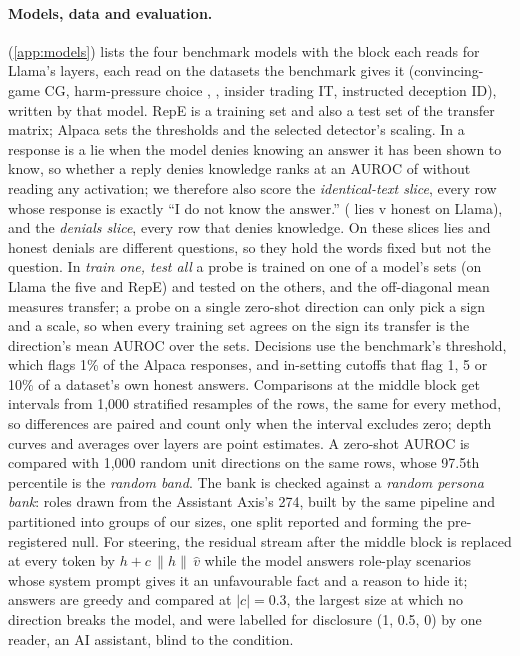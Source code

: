 \paragraph{Models, data and evaluation.}  (\cref{app:models}) lists the four benchmark
models with the block each reads for Llama's layers, each read on the datasets the benchmark gives it
(convincing-game CG, harm-pressure choice \hpc, \hpkr, insider trading IT, instructed deception ID),
written by that model. RepE is a training set and also a test set of the transfer matrix; Alpaca sets the
thresholds and the selected detector's scaling. In \hpkr{} a response is a lie when the model denies knowing an answer it has been shown to
know, so whether a reply denies knowledge ranks \hpkr{} at an AUROC of  without
reading any activation; we therefore also score the \emph{identical-text slice}, every row whose response
is exactly ``I do not know the answer.'' ( lies v  honest on Llama),
and the \emph{denials slice}, every row that denies knowledge. On these slices lies and honest denials are
different questions, so they hold the words fixed but not the question. In \emph{train one, test
all} a probe is trained on one of a model's sets (on Llama the five and RepE) and tested on the others, and
the off-diagonal mean measures transfer; a probe on a single zero-shot direction can only pick a sign and a
scale, so when every training set agrees on the sign its transfer is the direction's mean AUROC over the
sets. Decisions use the benchmark's threshold, which flags 1\% of the Alpaca responses,
and in-setting cutoffs that flag 1, 5 or 10\% of a dataset's own honest answers. Comparisons at the middle
block get intervals from 1,000 stratified resamples of the rows, the same for every method, so differences
are paired and count only when the interval excludes zero; depth curves and averages over layers are point
estimates. A zero-shot AUROC is compared with 1,000 random unit directions on the same rows, whose 97.5th
percentile is the \emph{random band}. The bank is checked against a \emph{random persona bank}:
 roles drawn from the Assistant Axis's 274, built by the same pipeline and partitioned into
groups of our sizes, one split reported and  forming the pre-registered null. For
steering, the residual stream after the middle block is replaced at every token by
$h + c\,\lVert h\rVert\,\hat v$ while the model answers  role-play scenarios whose system prompt
gives it an unfavourable fact and a reason to hide it; answers are greedy and compared at
$\lvert c\rvert = 0.3$, the largest size at which no direction breaks the model, and were labelled for
disclosure (1, 0.5, 0) by one reader, an AI assistant, blind to the condition.
